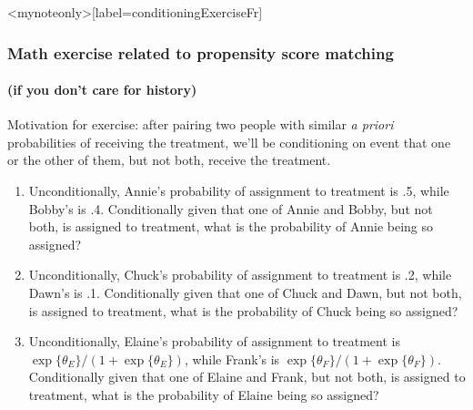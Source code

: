 \begin{frame}<mynoteonly>[label=conditioningExerciseFr]
  \frametitle{Math exercise related to propensity score matching} 
  \framesubtitle{(if you don't care for history)}

  Motivation for exercise: after pairing two people with similar \textit{a priori} probabilities of receiving the treatment, we'll be conditioning on event that one or the other of  them, but not both, receive the treatment.
  
  \begin{enumerate}
  \item Unconditionally, Annie's probability of assignment to treatment is .5, while Bobby's is .4.  Conditionally given that one of Annie and Bobby, but not both, is assigned to treatment, what is the probability of Annie being so assigned?
  \item Unconditionally, Chuck's probability of assignment to treatment is .2, while Dawn's is .1.  Conditionally given that one of Chuck and Dawn, but not both, is assigned to treatment, what is the probability of Chuck being so assigned?
      \item Unconditionally, Elaine's probability of assignment to treatment is $\exp\{\theta_{E} \}/(1+\exp\{\theta_{E} \}) $, while Frank's is $\exp\{\theta_{F} \}/(1+\exp\{\theta_{F} \}) $.  Conditionally given that one of Elaine and Frank, but not both, is assigned to treatment, what is the probability of Elaine being so assigned?
  \end{enumerate}
\end{frame}


